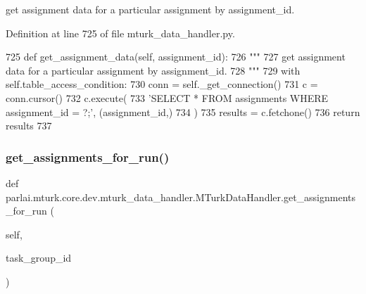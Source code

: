 \begin{DoxyVerb}get assignment data for a particular assignment by assignment_id.
\end{DoxyVerb}
 

Definition at line 725 of file mturk\+\_\+data\+\_\+handler.\+py.


\begin{DoxyCode}
725     \textcolor{keyword}{def }get\_assignment\_data(self, assignment\_id):
726         \textcolor{stringliteral}{"""}
727 \textcolor{stringliteral}{        get assignment data for a particular assignment by assignment\_id.}
728 \textcolor{stringliteral}{        """}
729         with self.table\_access\_condition:
730             conn = self.\_get\_connection()
731             c = conn.cursor()
732             c.execute(
733                 \textcolor{stringliteral}{'SELECT * FROM assignments WHERE assignment\_id = ?;'}, (assignment\_id,)
734             )
735             results = c.fetchone()
736             \textcolor{keywordflow}{return} results
737 
\end{DoxyCode}
\mbox{\label{classparlai_1_1mturk_1_1core_1_1dev_1_1mturk__data__handler_1_1MTurkDataHandler_aa3f132c04075d005d6639b938414ac0f}} 
\subsubsection{\texorpdfstring{get\+\_\+assignments\+\_\+for\+\_\+run()}{get\_assignments\_for\_run()}}
{\footnotesize\ttfamily def parlai.\+mturk.\+core.\+dev.\+mturk\+\_\+data\+\_\+handler.\+M\+Turk\+Data\+Handler.\+get\+\_\+assignments\+\_\+for\+\_\+run (\begin{DoxyParamCaption}\item[{}]{self,  }\item[{}]{task\+\_\+group\+\_\+id }\end{DoxyParamCaption})}

